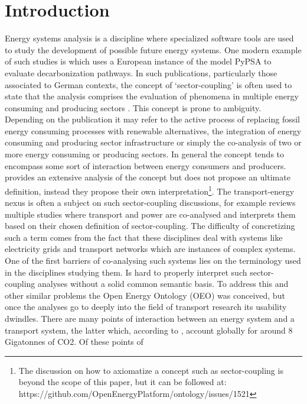 ﻿\section{Introduction}
\label{introduction}
Energy systems analysis is a discipline where specialized software tools are
used to study the development of possible future energy systems. One modern
example of such studies is \cite{Victoria.2022} which uses a European instance
of the model PyPSA \cite{Brown.2018} to evaluate decarbonization pathways. In
such publications, particularly those associated to German contexts, the
concept of `sector-coupling' is often used to state that the analysis comprises
the evaluation of phenomena in multiple energy consuming and producing sectors
\cite{Fridgen.2020}. This concept is prone to ambiguity. Depending on the
publication it may refer to the active process of replacing fossil energy
consuming processes with renewable alternatives, the integration of energy
consuming and producing sector infrastructure or simply the co-analysis of two
or more energy consuming or producing sectors. In general the concept tends to
encompass some sort of interaction between energy consumers and producers.
\cite{Ramsebner.2021} provides an extensive analysis of the concept but does
not propose an ultimate definition, instead they propose their own
interpretation\footnote{The discussion on how to axiomatize a concept such as
sector-coupling is beyond the scope of this paper, but it can be followed at:
https://github.com/OpenEnergyPlatform/ontology/issues/1521}. The
transport-energy nexus is often a subject on such sector-coupling discussions,
for example \cite{Robinius.2017} reviews multiple studies where transport and
power are co-analysed and interprets them based on their chosen definition of
sector-coupling. The difficulty of concretizing such a term comes from the fact
that these disciplines deal with systems like electricity grids and transport
networks which are instances of complex systems. One of the first barriers of
co-analysing  such systems lies on the terminology used in the disciplines
studying them. Is hard to properly interpret such sector-coupling analyses
without a solid common semantic basis. To address this and other similar
problems the Open Energy Ontology (OEO) \cite{Booshehri.2021} was conceived,
but once the analyses go to deeply into the field of transport research its
usability dwindles. There are many points of interaction between an energy
system and a transport system, the latter which, according to \cite{IEA.2023},
account globally for around 8 Gigatonnes of CO2. Of these points of
